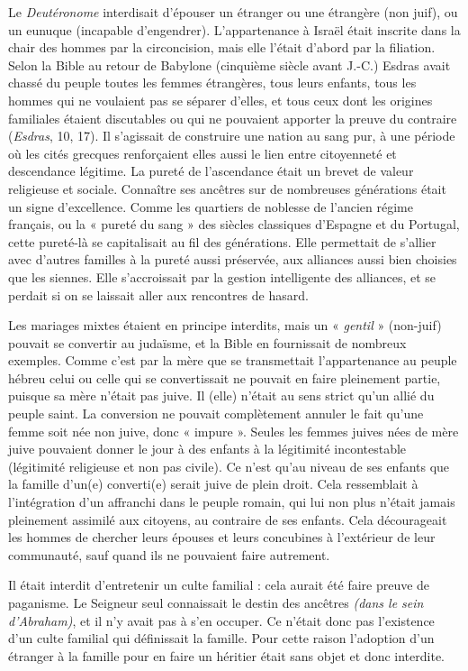  Le \emph{Deutéronome} interdisait d'épouser un étranger ou une étrangère (non juif), ou un eunuque (incapable d'engendrer). L'appartenance à Israël était inscrite dans la chair des hommes par la circoncision, mais elle l'était d'abord par la filiation. Selon la Bible au retour de Babylone (cinquième siècle avant J.-C.) Esdras avait chassé du peuple toutes les femmes étrangères, tous leurs enfants, tous les hommes qui ne voulaient pas se séparer d'elles, et tous ceux dont les origines familiales étaient discutables ou qui ne pouvaient apporter la preuve du contraire (\emph{Esdras}, 10, 17). Il s'agissait de construire une nation au sang pur, à une période où les cités grecques renforçaient elles aussi le lien entre citoyenneté et descendance légitime. La pureté de l'ascendance était un brevet de valeur religieuse et sociale. Connaître ses ancêtres sur de nombreuses générations était un signe d'excellence. Comme les quartiers de noblesse de l'ancien régime français, ou la « pureté du sang » des siècles classiques d'Espagne et du Portugal, cette pureté-là se capitalisait au fil des générations. Elle permettait de s'allier avec d'autres familles à la pureté aussi préservée, aux alliances aussi bien choisies que les siennes. Elle s'accroissait par la gestion intelligente des alliances, et se perdait si on se laissait aller aux rencontres de hasard. 

 Les mariages mixtes étaient en principe interdits, mais un « \emph{gentil} » (non-juif) pouvait se convertir au judaïsme, et la Bible en fournissait de nombreux exemples. Comme c'est par la mère que se transmettait l'appartenance au peuple hébreu celui ou celle qui se convertissait ne pouvait en faire pleinement partie, puisque sa mère n'était pas juive. Il (elle) n'était au sens strict qu'un allié du peuple saint. La conversion ne pouvait complètement annuler le fait qu'une femme soit née non juive, donc « impure ». Seules les femmes juives nées de mère juive pouvaient donner le jour à des enfants à la légitimité incontestable (légitimité religieuse et non pas civile). Ce n'est qu'au niveau de ses enfants que la famille d'un(e) converti(e) serait juive de plein droit. Cela ressemblait à l'intégration d'un affranchi dans le peuple romain, qui lui non plus n'était jamais pleinement assimilé aux citoyens, au contraire de ses enfants. Cela décourageait les hommes de chercher leurs épouses et leurs concubines à l'extérieur de leur communauté, sauf quand ils ne pouvaient faire autrement.

 Il était interdit d'entretenir un culte familial : cela aurait été faire preuve de paganisme. Le Seigneur seul connaissait le destin des ancêtres \emph{(dans le sein d'Abraham)}, et il n'y avait pas à s'en occuper. Ce n'était donc pas l'existence d'un culte familial qui définissait la famille. Pour cette raison l'adoption d'un étranger à la famille pour en faire un héritier était sans objet et donc interdite. 

